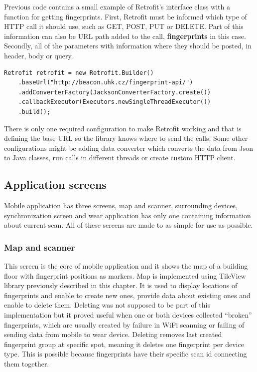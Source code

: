 Previous code contains a small example of Retrofit's interface class with a function for getting fingerprints. First, Retrofit must be informed which type of HTTP call it should use, such as GET, POST, PUT or DELETE. Part of this information can also be URL path added to the call, \textbf{fingerprints} in this case. Secondly, all of the parameters with information where they should be posted, in header, body or query.

\begin{lstlisting}[caption=Retrofit configuration example]
Retrofit retrofit = new Retrofit.Builder()
	.baseUrl("http://beacon.uhk.cz/fingerprint-api/")
	.addConverterFactory(JacksonConverterFactory.create())
	.callbackExecutor(Executors.newSingleThreadExecutor())
	.build();
\end{lstlisting}

There is only one required configuration to make Retrofit working and that is defining the base URL so the library knows where to send the calls. Some other configurations might be adding data converter which converts the data from Json to Java classes, run calls in different threads or create custom HTTP client.

\subsection{Application screens}\label{subsec:ApplicationScreens}
Mobile application has three screens, map and scanner, surrounding devices, synchronization screen and wear application has only one containing information about current scan. All of these screens are made to as simple for use as possible.

\subsubsection{Map and scanner}\label{subsec:MapAndScanner}
This screen is the core of mobile application and it shows the map of a building floor with fingerprint positions as markers. Map is implemented using TileView library previously described in this chapter. It is used to display locations of fingerprints and enable to create new ones, provide data about existing ones and enable to delete them. Deleting was not supposed to be part of this implementation but it proved useful when one or both devices collected \enquote{broken} fingerprints, which are usually created by failure in WiFi scanning or failing of sending data from mobile to wear device. Deleting removes last created fingerprint group at specific spot, meaning it deletes one fingerprint per device type. This is possible because fingerprints have their specific scan id connecting them together.


